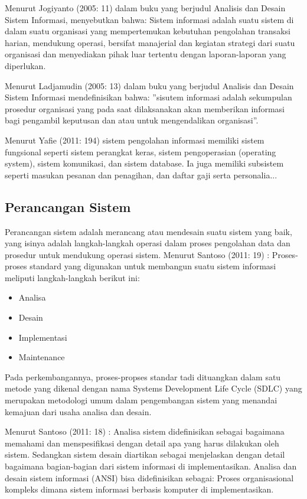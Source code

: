 \documentclass{jtetiproposalskripsi}
\begin{document}
Menurut Jogiyanto (2005: 11) dalam buku yang berjudul Analisis dan Desain Sistem Informasi, menyebutkan bahwa: Sistem informasi  adalah suatu sistem di dalam suatu organisasi yang mempertemukan kebutuhan pengolahan transaksi harian, mendukung operasi, bersifat manajerial dan kegiatan strategi dari suatu organisasi dan menyediakan pihak luar tertentu dengan laporan-laporan yang diperlukan.

Menurut Ladjamudin (2005: 13) dalam buku yang berjudul Analisis dan Desain Sistem Informasi mendefinisikan bahwa: ”sisutem informasi adalah sekumpulan prosedur organisasi yang pada saat dilaksanakan akan memberikan informasi bagi pengambil keputusan  dan  atau untuk mengendalikan organisasi”.

Menurut Yafie (2011: 194) sistem pengolahan informasi memiliki sistem fungsional seperti sistem perangkat keras, sistem pengoperasian (operating system), sistem komunikasi, dan sistem database. Ia juga memiliki subsistem seperti masukan pesanan dan penagihan, dan daftar gaji serta personalia...

\subsection{Perancangan Sistem}
Perancangan sistem adalah merancang atau mendesain suatu sistem yang baik, yang isinya adalah langkah-langkah operasi dalam proses pengolahan data dan prosedur untuk mendukung operasi sistem. 
Menurut Santoso (2011: 19) : Proses-proses standard yang digunakan untuk membangun suatu sistem informasi meliputi langkah-langkah berikut ini: 
\begin{itemize}
\item Analisa 
\item Desain 
\item Implementasi 
\item Maintenance 
\end{itemize}
Pada perkembangannya, proses-propses standar tadi dituangkan dalam satu metode yang dikenal dengan nama Systems Development Life Cycle (SDLC) yang merupakan metodologi umum dalam pengembangan sistem  yang menandai kemajuan dari usaha analisa dan desain.

Menurut Santoso (2011: 18) : Analisa sistem didefinisikan sebagai bagaimana memahami dan menspesifikasi dengan detail apa yang harus dilakukan oleh sistem. Sedangkan sistem desain diartikan sebagai menjelaskan dengan detail bagaimana bagian-bagian dari sistem informasi di implementasikan. Analisa dan desain sistem informasi (ANSI) bisa didefinisikan sebagai: Proses organisasional kompleks dimana sistem informasi berbasis komputer di implementasikan.
\end{document}
